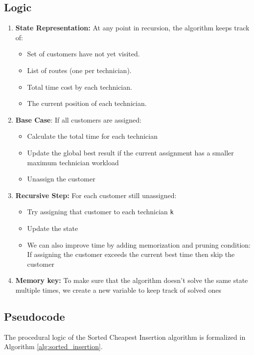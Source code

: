 \documentclass[11pt]{article}
\begin{document}
\subsection{Logic}
\begin{enumerate}
    \item \textbf{State Representation:} At any point in recursion, the algorithm keeps track of:
    \begin{itemize}
        \item Set of customers have not yet visited. 
        \item List of routes (one per technician). 
        \item Total time cost by each technician.
        \item The current position of each technician.
    \end{itemize}
    
    \item \textbf{Base Case}: If all customers are assigned:
    \begin{itemize}
        \item Calculate the total time for each technician
        \item Update the global best result if the current assignment has a smaller maximum technician workload
        \item Unassign the customer 
    \end{itemize}
        
    \item \textbf{Recursive Step: }For each customer still unassigned: 
    \begin{itemize}
        \item Try assigning that customer to each technician \texttt{k}
        \item Update the state 
        \item We can also improve time by adding memorization and pruning condition: If assigning the customer exceeds the current best time then skip the customer 
    \end{itemize}

    \item \textbf{Memory key: }To make sure that the algorithm doesn’t solve the same state multiple times, we create a new variable to keep track of solved ones
\end{enumerate}

\subsection{Pseudocode}
The procedural logic of the Sorted Cheapest Insertion algorithm is formalized in Algorithm \ref{alg:sorted_insertion}.
\end{document}

